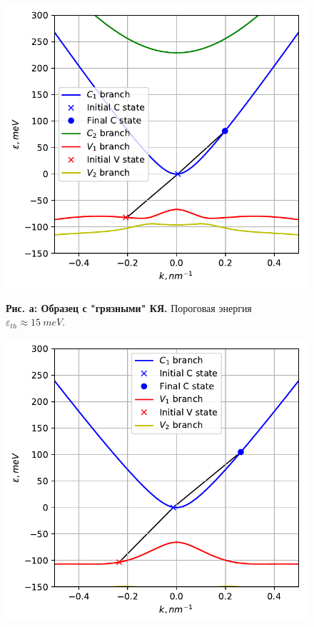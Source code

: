\documentclass[../main.tex]{subfiles}
\begin{document}
        \begin{figure}[h!]
            \begin{minipage}[h]{0.49\linewidth}
                \begin{center}
                    \includegraphics[width=1.\linewidth]{./images/18u_impure_40K.pdf}
    
                    \textbf{Рис. а: Образец с "грязными" КЯ.} Пороговая энергия 
                        $\varepsilon_{th} \approx 15~meV$.
                \end{center}
            \end{minipage}
            \hfill
            \begin{minipage}[h]{0.49\linewidth}
                \begin{center}
                    \includegraphics[width=1.\linewidth]{./images/18u_pure_40K.pdf}
    

\end{center}
\end{minipage}
\end{figure}
\end{document}
